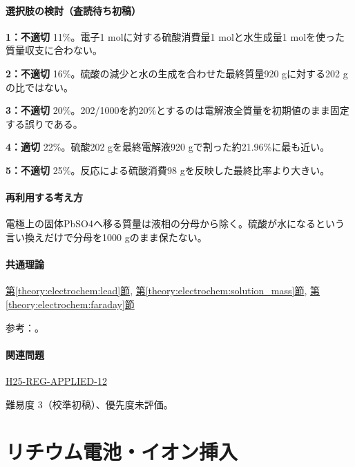 \paragraph{選択肢の検討（査読待ち初稿）}\mbox{}\par

\noindent\textbf{1：不適切} 11\%。電子1 molに対する硫酸消費量1 molと水生成量1 molを使った質量収支に合わない。\par

\noindent\textbf{2：不適切} 16\%。硫酸の減少と水の生成を合わせた最終質量920 gに対する202 gの比ではない。\par

\noindent\textbf{3：不適切} 20\%。202/1000を約20\%とするのは電解液全質量を初期値のまま固定する誤りである。\par

\noindent\textbf{4：適切} 22\%。硫酸202 gを最終電解液920 gで割った約21.96\%に最も近い。\par

\noindent\textbf{5：不適切} 25\%。反応による硫酸消費98 gを反映した最終比率より大きい。\par

\paragraph{再利用する考え方} 電極上の固体PbSO4へ移る質量は液相の分母から除く。硫酸が水になるという言い換えだけで分母を1000 gのまま保たない。

\paragraph{共通理論} \hyperref[theory:electrochem:lead]{第\ref*{theory:electrochem:lead}節}, \hyperref[theory:electrochem:solution_mass]{第\ref*{theory:electrochem:solution_mass}節}, \hyperref[theory:electrochem:faraday]{第\ref*{theory:electrochem:faraday}節}

\par 参考：\cite{openstax_batteries,mit_redox2014}。

\paragraph{関連問題} \hyperref[q:h25-reg-applied-12]{H25-REG-APPLIED-12}

\par 難易度 3（校準初稿）、優先度未評価。

\section{リチウム電池・イオン挿入}

